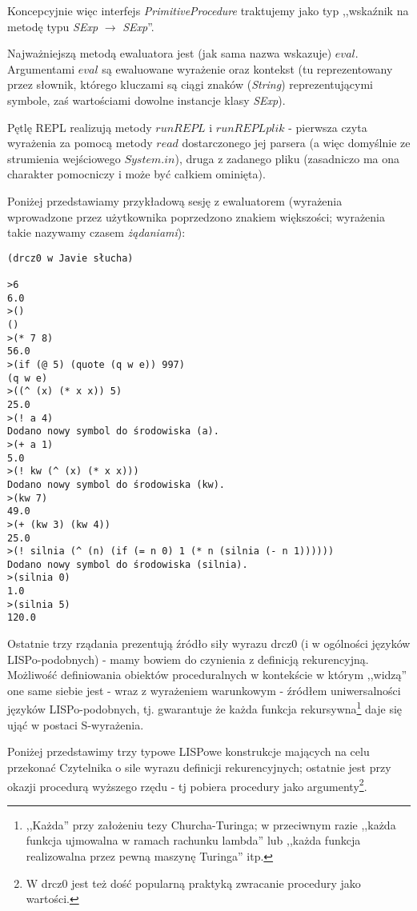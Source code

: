 \documentclass[a4paper]{article}
\begin{document}
Koncepcyjnie więc interfejs \emph{PrimitiveProcedure} traktujemy jako typ ,,wskaźnik na metodę
typu \emph{SExp} $\rightarrow$ \emph{SExp}''.


Najważniejszą metodą ewaluatora jest (jak sama nazwa wskazuje) $eval$. Argumentami $eval$ są ewaluowane
wyrażenie oraz kontekst (tu reprezentowany przez słownik, którego kluczami są ciągi znaków (\emph{String})
reprezentującymi symbole, zaś wartościami dowolne instancje klasy \emph{SExp}).

Pętlę REPL realizują metody $runREPL$ i $runREPLplik$ - pierwsza czyta wyrażenia za pomocą
metody $read$ dostarczonego jej parsera (a więc domyślnie ze strumienia wejściowego $System.in$),
druga z zadanego pliku (zasadniczo ma ona charakter pomocniczy i może być całkiem ominięta).

Poniżej przedstawiamy przykładową sesję z ewaluatorem (wyrażenia wprowadzone przez użytkownika
poprzedzono znakiem większości; wyrażenia takie nazywamy czasem \emph{żądaniami}):
\small
\begin{verbatim}
(drcz0 w Javie słucha)

>6
6.0
>()
()
>(* 7 8)
56.0
>(if (@ 5) (quote (q w e)) 997)
(q w e)
>((^ (x) (* x x)) 5)
25.0
>(! a 4)
Dodano nowy symbol do środowiska (a).
>(+ a 1)
5.0
>(! kw (^ (x) (* x x)))
Dodano nowy symbol do środowiska (kw).
>(kw 7)
49.0
>(+ (kw 3) (kw 4))
25.0
>(! silnia (^ (n) (if (= n 0) 1 (* n (silnia (- n 1))))))
Dodano nowy symbol do środowiska (silnia).
>(silnia 0)
1.0
>(silnia 5)
120.0
\end{verbatim}
\normalsize

Ostatnie trzy rządania prezentują źródło siły wyrazu drcz0 (i w ogólności języków LISPo-podobnych)
- mamy bowiem do czynienia z definicją rekurencyjną. Możliwość definiowania obiektów proceduralnych
w kontekście w którym ,,widzą'' one same siebie jest - wraz z wyrażeniem warunkowym - źródłem
uniwersalności języków LISPo-podobnych, tj. gwarantuje że każda funkcja rekursywna\footnote{,,Każda'' przy
założeniu tezy Churcha-Turinga; w przeciwnym razie ,,każda funkcja ujmowalna w ramach rachunku lambda''
lub ,,każda funkcja realizowalna przez pewną maszynę Turinga'' itp.} daje się ująć w postaci
S-wyrażenia.

Poniżej przedstawimy trzy typowe LISPowe konstrukcje mających na celu przekonać Czytelnika o sile wyrazu
definicji rekurencyjnych; ostatnie jest przy okazji procedurą wyższego rzędu - tj pobiera procedury
jako argumenty\footnote{W drcz0 jest też dość popularną praktyką zwracanie procedury jako wartości.}.
\end{document}
